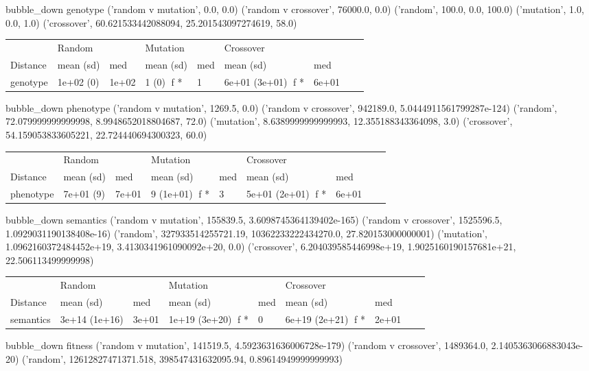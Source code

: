 bubble_down
genotype
('random v mutation', 0.0, 0.0)
('random v crossover', 76000.0, 0.0)
('random', 100.0, 0.0, 100.0)
('mutation', 1.0, 0.0, 1.0)
('crossover', 60.621533442088094, 25.201543097274619, 58.0)
\begin{tabular}{l|ll|lll|lll}
         & Random      &      & Mutation       &       & Crossover       &       \\
Distance & mean (sd)   & med  & mean (sd)      & med   & mean (sd)       & med   \\ \hline
 genotype      & 1e+02 (0) & 1e+02 & 1 (0) {f *} & 1  & 6e+01 (3e+01) {f *}  & 6e+01  \\
\end{tabular}
bubble_down
phenotype
('random v mutation', 1269.5, 0.0)
('random v crossover', 942189.0, 5.0444911561799287e-124)
('random', 72.079999999999998, 8.9948652018804687, 72.0)
('mutation', 8.6389999999999993, 12.355188343364098, 3.0)
('crossover', 54.159053833605221, 22.724440694300323, 60.0)
\begin{tabular}{l|ll|lll|lll}
         & Random      &      & Mutation       &       & Crossover       &       \\
Distance & mean (sd)   & med  & mean (sd)      & med   & mean (sd)       & med   \\ \hline
 phenotype      & 7e+01 (9) & 7e+01 & 9 (1e+01) {f *} & 3  & 5e+01 (2e+01) {f *}  & 6e+01  \\
\end{tabular}
bubble_down
semantics
('random v mutation', 155839.5, 3.6098745364139402e-165)
('random v crossover', 1525596.5, 1.0929031190138408e-16)
('random', 327933514255721.19, 10362233222434270.0, 27.820153000000001)
('mutation', 1.0962160372484452e+19, 3.4130341961090092e+20, 0.0)
('crossover', 6.204039585446998e+19, 1.9025160190157681e+21, 22.506113499999998)
\begin{tabular}{l|ll|lll|lll}
         & Random      &      & Mutation       &       & Crossover       &       \\
Distance & mean (sd)   & med  & mean (sd)      & med   & mean (sd)       & med   \\ \hline
 semantics      & 3e+14 (1e+16) & 3e+01 & 1e+19 (3e+20) {f *} & 0  & 6e+19 (2e+21) {f *}  & 2e+01  \\
\end{tabular}
bubble_down
fitness
('random v mutation', 141519.5, 4.5923631636006728e-179)
('random v crossover', 1489364.0, 2.1405363066883043e-20)
('random', 12612827471371.518, 398547431632095.94, 0.89614949999999993)
